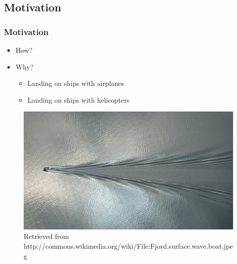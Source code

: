 \subsection{Motivation}

\begin{frame}[<+(1)->]
\frametitle{Motivation}

\begin{itemize} %
\item How?
\item Why?
\begin{itemize}
\item Landing on ships with airplanes
\item Landing on ships with helicopters
\end{itemize}
\end{itemize}

\begin{figure}
\centering
\includegraphics[width=.8\textwidth]{Images/Attribute/Wake/Fjord_surface_wave_boat}
\caption{Retrieved from http://commons.wikimedia.org/wiki/File:Fjord.surface.wave.boat.jpeg}
\end{figure}

\end{frame}
